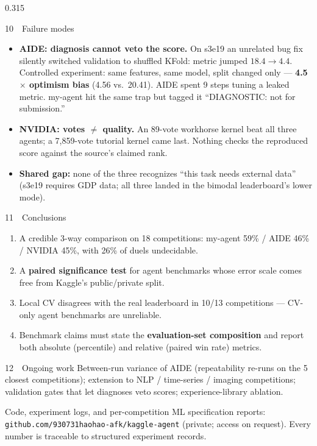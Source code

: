 \documentclass[final]{beamer}
\newcommand{\highlight}[1]{\textcolor{accent}{\textbf{#1}}}
\begin{document}
\begin{frame}[t]
\begin{columns}[t]
\begin{column}{0.315\textwidth}
\begin{block}{10~~Failure modes}
\begin{itemize}
  \item \highlight{AIDE: diagnosis cannot veto the score.} On s3e19 an unrelated bug fix silently switched validation to shuffled KFold: metric jumped $18.4 \to 4.4$. Controlled experiment: same features, same model, split changed only --- \textbf{4.5$\times$ optimism bias} (4.56 vs.\ 20.41). AIDE spent 9 steps tuning a leaked metric. my-agent hit the same trap but tagged it ``DIAGNOSTIC: not for submission.''
  \item \highlight{NVIDIA: votes $\neq$ quality.} An 89-vote workhorse kernel beat all three agents; a 7{,}859-vote tutorial kernel came last. Nothing checks the reproduced score against the source's claimed rank.
  \item \highlight{Shared gap:} none of the three recognizes ``this task needs external data'' (s3e19 requires GDP data; all three landed in the bimodal leaderboard's lower mode).
\end{itemize}
\end{block}

\begin{block}{11~~Conclusions}
\begin{enumerate}
  \item A credible 3-way comparison on 18 competitions: my-agent 59\% / AIDE 46\% / NVIDIA 45\%, with 26\% of duels undecidable.
  \item A \textbf{paired significance test} for agent benchmarks whose error scale comes free from Kaggle's public/private split.
  \item Local CV disagrees with the real leaderboard in 10/13 competitions --- CV-only agent benchmarks are unreliable.
  \item Benchmark claims must state the \textbf{evaluation-set composition} and report both absolute (percentile) and relative (paired win rate) metrics.
\end{enumerate}
\end{block}

\begin{block}{12~~Ongoing work}
Between-run variance of AIDE (repeatability re-runs on the 5 closest competitions); extension to NLP / time-series / imaging competitions; validation gates that let diagnoses veto scores; experience-library ablation.
\end{block}

\vspace{0.4ex}
{\small\color{midgray} Code, experiment logs, and per-competition ML specification reports: \texttt{github.com/930731haohao-afk/kaggle-agent} (private; access on request). Every number is traceable to structured experiment records.}

\end{column}

\end{columns}
\end{frame}
\end{document}
